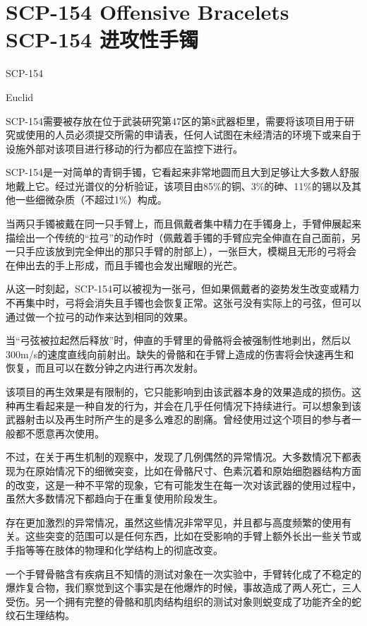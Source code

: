 \chapter[SCP-154 进攻性手镯]{
    SCP-154 Offensive Bracelets \\
    SCP-154 进攻性手镯
}

\label{chap:SCP-154}

SCP-154

Euclid

SCP-154需要被存放在位于武装研究第47区的第8武器柜里，需要将该项目用于研究或使用的人员必须提交所需的申请表，任何人试图在未经清洁的环境下或来自于设施外部对该项目进行移动的行为都应在监控下进行。

SCP-154是一对简单的青铜手镯，它看起来非常地圆而且大到足够让大多数人舒服地戴上它。经过光谱仪的分析验证，该项目由85\%的铜、3\%的砷、11\%的锡以及其他一些细微杂质（不超过1\%）构成。

当两只手镯被戴在同一只手臂上，而且佩戴者集中精力在手镯身上，手臂伸展起来描绘出一个传统的“拉弓”的动作时（佩戴着手镯的手臂应完全伸直在自己面前，另一只手应该放到完全伸出的那只手臂的肘部上），一张巨大，模糊且无形的弓将会在伸出去的手上形成，而且手镯也会发出耀眼的光芒。

从这一时刻起，SCP-154可以被视为一张弓，但如果佩戴者的姿势发生改变或精力不再集中时，弓将会消失且手镯也会恢复正常。这张弓没有实际上的弓弦，但可以通过做一个拉弓的动作来达到相同的效果。

当“弓弦被拉起然后释放”时，伸直的手臂里的骨骼将会被强制性地剥出，然后以300m\slash s的速度直线向前射出。缺失的骨骼和在手臂上造成的伤害将会快速再生和恢复，而且可以在数分钟之内进行再次发射。

该项目的再生效果是有限制的，它只能影响到由该武器本身的效果造成的损伤。这种再生看起来是一种自发的行为，并会在几乎任何情况下持续进行。可以想象到该武器射击以及再生时所产生的是多么难忍的剧痛。曾经使用过这个项目的参与者一般都不愿意再次使用。

不过，在关于再生机制的观察中，发现了几例偶然的异常情况。大多数情况下都表现为在原始情况下的细微突变，比如在骨骼尺寸、色素沉着和原始细胞器结构方面的改变，这是一种不平常的现象，它有可能发生在每一次对该武器的使用过程中，虽然大多数情况下都趋向于在重复使用阶段发生。

存在更加激烈的异常情况，虽然这些情况非常罕见，并且都与高度频繁的使用有关。这些突变的范围可以是任何东西，比如在受影响的手臂上额外长出一些关节或手指等等在肢体的物理和化学结构上的彻底改变。

一个手臂骨骼含有疾病且不知情的测试对象在一次实验中，手臂转化成了不稳定的爆炸复合物，我们察觉到这个事实是在他爆炸的时候，事故造成了两人死亡，三人受伤。另一个拥有完整的骨骼和肌肉结构组织的测试对象则蜕变成了功能齐全的蛇纹石生理结构。

